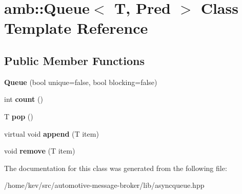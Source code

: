\hypertarget{classamb_1_1Queue}{\section{amb\+:\+:Queue$<$ T, Pred $>$ Class Template Reference}
\label{classamb_1_1Queue}
}
\subsection*{Public Member Functions}
\begin{DoxyCompactItemize}
\item 
\hypertarget{classamb_1_1Queue_a6aa1ad43181e2f7277f99a4591b3f116}{{\bfseries Queue} (bool unique=false, bool blocking=false)}\label{classamb_1_1Queue_a6aa1ad43181e2f7277f99a4591b3f116}

\item 
\hypertarget{classamb_1_1Queue_ab3896fe943b628902a5148a4fa7cb61a}{int {\bfseries count} ()}\label{classamb_1_1Queue_ab3896fe943b628902a5148a4fa7cb61a}

\item 
\hypertarget{classamb_1_1Queue_ac837c984d97965ab1f584462441509cc}{T {\bfseries pop} ()}\label{classamb_1_1Queue_ac837c984d97965ab1f584462441509cc}

\item 
\hypertarget{classamb_1_1Queue_a723ec2204cc96eb51d1cbda721000503}{virtual void {\bfseries append} (T item)}\label{classamb_1_1Queue_a723ec2204cc96eb51d1cbda721000503}

\item 
\hypertarget{classamb_1_1Queue_a67967c4d70037e3b02365bdcce4dbb52}{void {\bfseries remove} (T item)}\label{classamb_1_1Queue_a67967c4d70037e3b02365bdcce4dbb52}

\end{DoxyCompactItemize}


The documentation for this class was generated from the following file\+:\begin{DoxyCompactItemize}
\item 
/home/kev/src/automotive-\/message-\/broker/lib/asyncqueue.\+hpp\end{DoxyCompactItemize}
